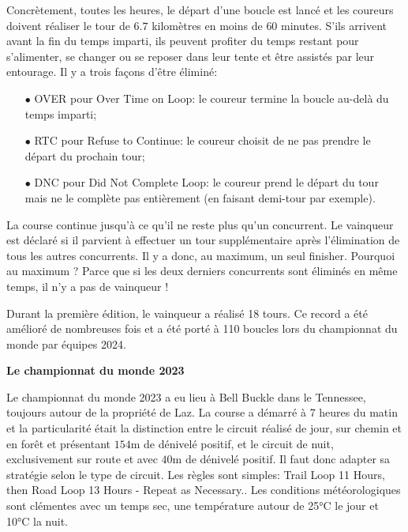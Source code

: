 \documentclass[a4paper,12pt]{article}
\begin{document}
Concrètement, toutes les heures, le départ d'une boucle est lancé et les coureurs doivent réaliser le tour de $6.7$ kilomètres en moins de $60$ minutes. S'ils arrivent avant la fin du temps imparti, ils peuvent profiter du temps restant pour s'alimenter, se changer ou se reposer dans leur tente et être assistés par leur entourage. 
Il y a trois façons d'être éliminé:
\begin{itemize}
	\item[$\bullet$] OVER pour Over Time on Loop: le coureur termine la boucle au-delà du temps imparti;
	\item[$\bullet$] RTC pour Refuse to Continue: le coureur choisit de ne pas prendre le départ du prochain tour;
	\item[$\bullet$] DNC pour Did Not Complete Loop: le coureur prend le départ du tour mais ne le complète pas entièrement (en faisant demi-tour par exemple).
\end{itemize}




\medskip
La course continue jusqu'à ce qu'il ne reste plus qu'un concurrent. Le vainqueur est déclaré si il parvient à effectuer un tour supplémentaire après l'élimination de tous les autres concurrents. Il y a donc, au maximum, un seul finisher. Pourquoi au maximum ? Parce que si les deux derniers concurrents sont éliminés en même temps, il n'y a pas de vainqueur !

\medskip

Durant la première édition, le vainqueur a réalisé 18 tours. Ce record a été amélioré de nombreuses fois et a été porté à 110 boucles lors du championnat du monde par équipes 2024. 

\begin{center}
	\textbf{Le championnat du monde 2023}
\end{center}

Le championnat du monde 2023 a eu lieu à Bell Buckle dans le Tennessee, toujours autour de la propriété de Laz. La course a démarré à 7 heures du matin et la particularité était la distinction entre le circuit réalisé de jour, sur chemin et en forêt et présentant $154$m de dénivelé positif, et le circuit de nuit, exclusivement sur route et avec $40$m de dénivelé positif. Il faut donc adapter sa stratégie selon le type de circuit. Les règles sont simples: \og Trail Loop 11 Hours, then Road Loop 13 Hours - Repeat as Necessary.\fg{}. Les conditions météorologiques sont clémentes avec un temps sec, une température autour de 25°C le jour et 10°C la nuit.
\end{document}
